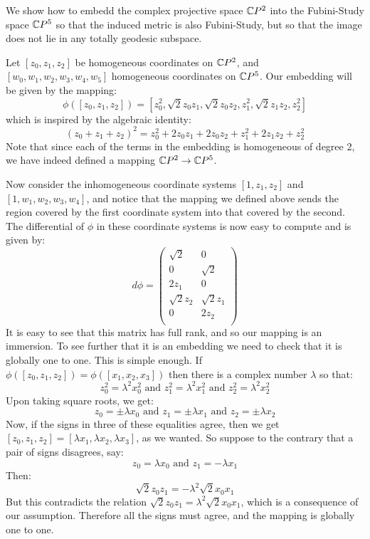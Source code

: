 \begin{example}  We show how to embedd the complex projective space $\mathbb{C}P^2$ into the Fubini-Study space $\mathbb{C}P^5$ so that the induced metric is also Fubini-Study, but so that the image does not lie in any totally geodesic subspace.  

Let $[z_0, z_1, z_2]$ be homogeneous coordinates on $\mathbb{C}P^2$, and $[w_0, w_1, w_2, w_3, w_4, w_5]$ homogeneous coordinates on $\mathbb{C}P^5$.  Our embedding will be given by the mapping:
%
$$ \phi( [z_0, z_1, z_2] ) = [z_0^2, \sqrt{2} z_0 z_1, \sqrt{2} z_0 z_2, z_1^2, \sqrt{2} z_1 z_2, z_2^2 ] $$
%
which is inspired by the algebraic identity: 
%
$$ ( z_0 + z_1 + z_2 )^2 = z_0^2 + 2 z_0 z_1 + 2 z_0 z_2 + z_1^2 + 2 z_1 z_2 + z_2^2 $$
%
Note that since each of the terms in the embedding is homogeneous of degree 2, we have indeed defined a mapping $\mathbb{C}P^2 \rightarrow \mathbb{C}P^5$.

Now consider the inhomogeneous coordinate systems $[1,z_1,z_2]$ and $[1,w_1,w_2,w_3,w_4]$, and notice that the mapping we defined above sends the region covered by the first coordinate system into that covered by the second.  The differential of $\phi$ in these coordinate systems is now easy to compute and is given by:
%
$$ d \phi =
\left( \begin{array}{cc} 
\sqrt{2} & 0 \\
0 & \sqrt{2} \\
2 z_1 & 0 \\
\sqrt{2} z_2 & \sqrt{2} z_1 \\
0 & 2 z_2 \\
\end{array} \right) $$
% 
It is easy to see that this matrix has full rank, and so our mapping is an immersion.  To see further that it is an embedding we need to check that it is globally one to one.  This is simple enough.  If $\phi( [z_0, z_1, z_2 ] ) = \phi( [x_1, x_2, x_3] )$ then there is a complex number $\lambda$ so that:
%
$$ z_0^2 = \lambda^2 x_0^2 \text{ and } z_1^2 = \lambda^2 x_1^2 \text{ and } z_2^2 = \lambda^2 x_2^2 $$
%
Upon taking square roots, we get:
%
$$ z_0 = \pm \lambda x_0 \text{ and } z_1 = \pm \lambda x_1 \text{ and } z_2 = \pm \lambda x_2 $$
%
Now, if the signs in three of these equalities agree, then we get $[ z_0, z_1, z_2 ] = [ \lambda x_1, \lambda x_2, \lambda x_3 ]$, as we wanted.  So suppose to the contrary that a pair of signs disagrees, say:
%
$$ z_0 = \lambda x_0 \text{ and } z_1 = - \lambda x_1 $$
%
Then:
%
$$ \sqrt{2} z_0 z_1 = - \lambda^2 \sqrt{2} x_0 x_1 $$
%
But this contradicts the relation $ \sqrt{2} z_0 z_1 = \lambda^2 \sqrt{2} x_0 x_1 $, which is a consequence of our assumption.  Therefore all the signs must agree, and the mapping is globally one to one.  


\end{example}
